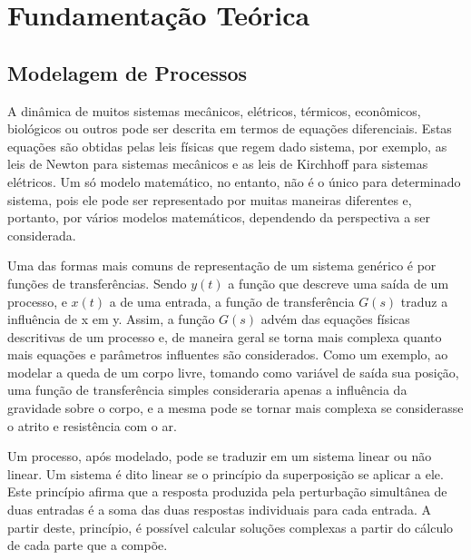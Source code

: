 \chapter{Fundamentação Teórica}

\section{Modelagem de Processos}

A dinâmica de muitos sistemas mecânicos, elétricos, térmicos, econômicos, biológicos ou outros pode ser descrita em termos de equações diferenciais. Estas equações são obtidas pelas leis físicas que regem dado sistema, por exemplo, as leis de Newton para sistemas mecânicos e as leis de Kirchhoff para sistemas elétricos. Um só modelo matemático, no entanto, não é o único para determinado sistema, pois ele pode ser representado por muitas maneiras diferentes e, portanto, por vários modelos matemáticos, dependendo da perspectiva a ser considerada. \cite{katsuhiro2010}

Uma das formas mais comuns de representação de um sistema genérico é por funções de transferências. Sendo $y(t)$ a função que descreve uma saída de um processo, e $x(t)$ a de uma entrada, a função de transferência $G(s)$ traduz a influência de x em y. Assim, a função $G(s)$ advém das equações físicas descritivas de um processo e, de maneira geral se torna mais complexa quanto mais equações e parâmetros influentes são considerados. Como um exemplo, ao modelar a queda de um corpo livre, tomando como variável de saída sua posição, uma função de transferência simples consideraria apenas a influência da gravidade sobre o corpo, e a mesma pode se tornar mais complexa se considerasse o atrito e resistência com o ar.

Um processo, após modelado, pode se traduzir em um sistema linear ou não linear. Um sistema é dito linear se o princípio da superposição se aplicar a ele. Este princípio afirma que a resposta produzida pela perturbação simultânea de duas entradas é a soma das duas respostas individuais para cada entrada. A partir deste, princípio, é possível calcular soluções complexas a partir do cálculo de cada parte que a compõe. \cite{katsuhiro2010}

